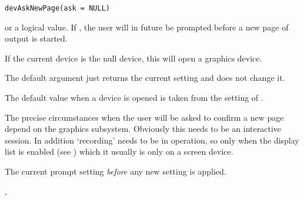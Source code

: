 %
\begin{Usage}
\begin{verbatim}
devAskNewPage(ask = NULL)
\end{verbatim}
\end{Usage}
%
\begin{Arguments}
\begin{ldescription}
\item[\code{ask}]  or a logical value.  If , the user
will in future be prompted before a new page of output is started.
\end{ldescription}
\end{Arguments}
%
\begin{Details}\relax
If the current device is the null device, this will open a graphics device.

The default argument just returns the current setting and does not
change it.

The default value when a device is opened is taken from the
setting of .

The precise circumstances when the user will be asked to confirm a new
page depend on the graphics subsystem.  Obviously this needs to be an
interactive session.  In addition `recording' needs to be in
operation, so only when the display list is enabled (see
) which it usually is only on a screen device.
\end{Details}
%
\begin{Value}
The current prompt setting \emph{before} any new setting is applied.
\end{Value}
%
\begin{SeeAlso}\relax
{}, 
\end{SeeAlso}
%

